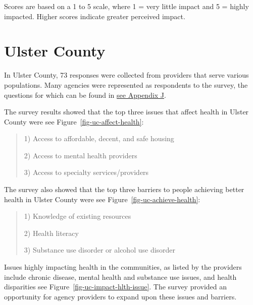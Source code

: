 \documentclass[
  english,
  letterpaper,
]{report}
\begin{document}
\begin{tcolorbox}[enhanced jigsaw, breakable, leftrule=.75mm, title=\textcolor{quarto-callout-note-color}{\faInfo}\hspace{0.5em}{Note}, bottomrule=.15mm, opacityback=0, left=2mm, colback=white, bottomtitle=1mm, coltitle=black, colbacktitle=quarto-callout-note-color!10!white, colframe=quarto-callout-note-color-frame, opacitybacktitle=0.6, toptitle=1mm, titlerule=0mm, arc=.35mm, rightrule=.15mm, toprule=.15mm]

Scores are based on a 1 to 5 scale, where 1 = very little impact and 5 =
highly impacted. Higher scores indicate greater perceived impact.

\end{tcolorbox}

\section{Ulster County}\label{ulster-county-1}

In Ulster County, 73 responses were collected from providers that serve
various populations. Many agencies were represented as respondents to
the survey, the questions for which can be found in
\hyperref[sec-appendix-j-community-partner-survey-references]{see
Appendix J}.

The survey results showed that the top three issues that affect health
in Ulster County were see Figure~\ref{fig-uc-affect-health}:

\begin{quote}
1) Access to affordable, decent, and safe housing

2) Access to mental health providers

3) Access to specialty services/providers
\end{quote}

The survey also showed that the top three barriers to people achieving
better health in Ulster County were see
Figure~\ref{fig-uc-achieve-health}:

\begin{quote}
1) Knowledge of existing resources

2) Health literacy

3) Substance use disorder or alcohol use disorder
\end{quote}

Issues highly impacting health in the communities, as listed by the
providers include chronic disease, mental health and substance use
issues, and health disparities see
Figure~\ref{fig-uc-impact-hlth-issue}. The survey provided an
opportunity for agency providers to expand upon these issues and
barriers.
\end{document}
